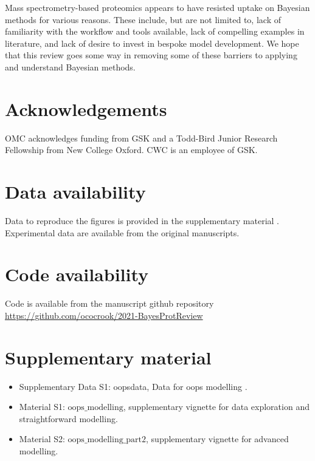 \documentclass[12pt,english, journal=jpr, layout=twocolumn]{article}
\begin{document}
Mass spectrometry-based proteomics appears to have resisted uptake on Bayesian methods for various reasons. These include, but are not limited to, lack of familiarity with the workflow and tools available, lack of compelling examples in literature, and lack of desire to invest in bespoke model development. We hope that this review goes some way in removing some of these barriers to applying and understand Bayesian methods. 

\section{Acknowledgements}
OMC acknowledges funding from GSK and a Todd-Bird Junior Research Fellowship from New College Oxford. CWC is an employee of GSK. 
\section{Data availability}
Data to reproduce the figures is provided in the supplementary material . Experimental data are available from the original manuscripts.
\section{Code availability}
Code is available from the manuscript github repository \url{https://github.com/ococrook/2021-BayesProtReview}
\section{Supplementary material}
\begin{itemize}
\item Supplementary Data S1: oopsdata, Data for oops modelling .
\item Material S1: $\text{oops\_modelling}$, supplementary vignette for data exploration and straightforward modelling.
\item Material S2: $\text{oops\_modelling\_part2}$, supplementary vignette for advanced modelling.   
\end{itemize}
	

	
\end{document}
